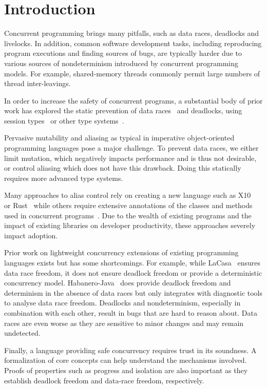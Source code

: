 \chapter{Introduction}
Concurrent programming brings many pitfalls, such as data races, deadlocks and livelocks. In addition, common software development tasks, including reproducing program executions and finding sources of bugs, are typically harder due to various sources of nondeterminism introduced by concurrent programming models. For example, shared-memory threads commonly permit large numbers of thread inter-leavings. \cite{goetz_java_2006}

In order to increase the safety of concurrent programs, a substantial body of prior work has explored the static prevention of data races~\cite{boyapati_parameterized_2001,haller_lacasa_2016} and deadlocks, using session types~\cite{honda_multiparty_2016} or other type systems~\cite{boyapati_ownership_2002}.

Pervasive mutability and aliasing as typical in imperative object-oriented programming languages pose a major challenge. To prevent data races, we either limit mutation, which negatively impacts performance and is thus not desirable, or control aliasing which does not have this drawback. Doing this statically requires more advanced type systems.

Many approaches to alias control rely on creating a new language such as X10~\cite{charles_x10_2005} or Rust~\cite{matsakis_rust_2014} while others require extensive annotations of the classes and methods used in concurrent programs~\cite{bocchino_type_2009}. Due to the wealth of existing programs and the impact of existing libraries on developer productivity, these approaches severely impact adoption.

Prior work on lightweight concurrency extensions of existing programming languages exists but has some shortcomings. For example, while LaCasa~\cite{haller_lacasa_2016} ensures data race freedom, it does not ensure deadlock freedom or provide a deterministic concurrency model. Habanero-Java~\cite{cave_habanero-java_2011} does provide deadlock freedom and determinism in the absence of data races but only integrates with diagnostic tools to analyse data race freedom. Deadlocks and nondeterminism, especially in combination with each other, result in bugs that are hard to reason about. Data races are even worse as they are sensitive to minor changes and may remain undetected.

Finally, a language providing safe concurrency requires trust in its soundness. A formalization of core concepts can help understand the mechanisms involved. Proofs of properties such as progress and isolation are also important as they establish deadlock freedom and data-race freedom, respectively.


